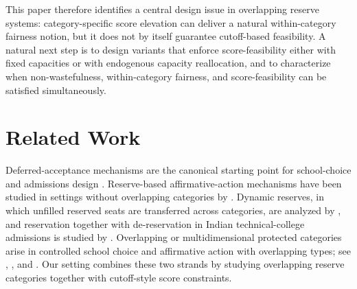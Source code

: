\documentclass[10pt]{article}
\newcommand{\1}{\mathbf{1}}
\begin{document}
This paper therefore identifies a central design issue in overlapping reserve systems: category-specific score elevation can deliver a natural within-category fairness notion, but it does not by itself guarantee cutoff-based feasibility. A natural next step is to design variants that enforce score-feasibility either with fixed capacities or with endogenous capacity reallocation, and to characterize when non-wastefulness, within-category fairness, and score-feasibility can be satisfied simultaneously.


\section{Related Work}
Deferred-acceptance mechanisms are the canonical starting point for school-choice and admissions design \citep{GaSh62a,Roth08a,AbSo03b}. Reserve-based affirmative-action mechanisms have been studied in settings without overlapping categories by \citet{Abdu05a}. Dynamic reserves, in which unfilled reserved seats are transferred across categories, are analyzed by \citet{AyTu20a}, and reservation together with de-reservation in Indian technical-college admissions is studied by \citet{AyTu23a}. Overlapping or multidimensional protected categories arise in controlled school choice and affirmative action with overlapping types; see \citet{KHIY17a}, \citet{GKK+17a}, and \citet{AyBo21a}. Our setting combines these two strands by studying overlapping reserve categories together with cutoff-style score constraints.


  
\end{document}
